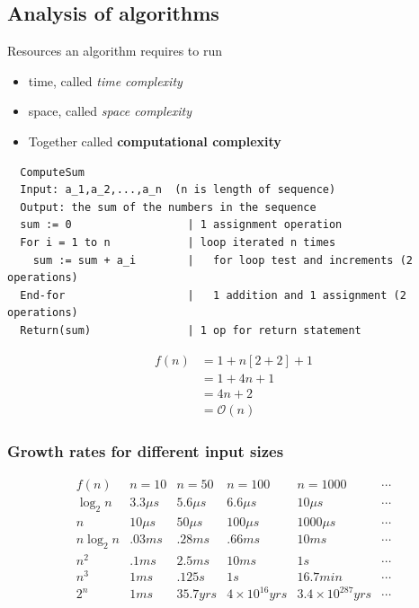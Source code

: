 \subsection{Analysis of algorithms}
Resources an algorithm requires to run
\begin{itemize}
  \item time, called \textit{time complexity}
  \item space, called \textit{space complexity}
  \item Together called \textbf{computational complexity}
\end{itemize}
\begin{lstlisting}
  ComputeSum
  Input: a_1,a_2,...,a_n  (n is length of sequence)
  Output: the sum of the numbers in the sequence
  sum := 0                  | 1 assignment operation
  For i = 1 to n            | loop iterated n times
    sum := sum + a_i        |   for loop test and increments (2 operations)
  End-for                   |   1 addition and 1 assignment (2 operations)
  Return(sum)               | 1 op for return statement
\end{lstlisting}
\begin{align*}
  f(n) & = 1 + n[2+2] + 1 \\
       & = 1 + 4n + 1     \\
       & = 4n + 2         \\
       & = \mathcal{O}(n)
\end{align*}

\subsubsection*{Growth rates for different input sizes}
\[
  \begin{matrix}
    f(n)       & n=10      & n=50      & n=100                & n=1000                  & \cdots \\
    \log_{2}n  & 3.3 \mu s & 5.6 \mu s & 6.6 \mu s            & 10 \mu s                & \cdots \\
    n          & 10 \mu s  & 50 \mu s  & 100 \mu s            & 1000 \mu s              & \cdots \\
    n\log_{2}n & .03 ms    & .28 ms    & .66 ms               & 10 ms                   & \cdots \\
    n^2        & .1 ms     & 2.5 ms    & 10 ms                & 1 s                     & \cdots \\
    n^3        & 1 ms      & .125 s    & 1 s                  & 16.7 min                & \cdots \\
    2^n        & 1 ms      & 35.7 yrs  & 4 \times 10^{16} yrs & 3.4 \times 10^{287} yrs & \cdots \\
  \end{matrix}
\]

